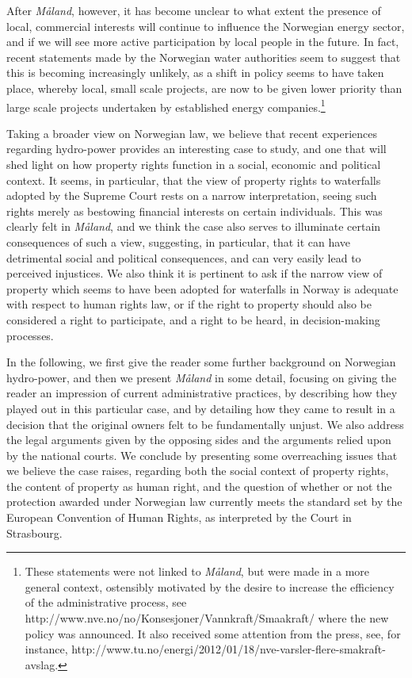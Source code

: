 After \emph{Måland}, however, it has become unclear to what extent the presence of local, commercial interests will continue to influence the Norwegian energy sector, and if we will see more active participation by local people in the future. In fact, recent statements made by the Norwegian water authorities seem to suggest that this is becoming increasingly unlikely, as a shift in policy seems to have taken place, whereby local, small scale projects, are now to be given lower priority than large scale projects undertaken by established energy companies.\footnote{These statements were not linked to \emph{Måland}, but were made in a more general context, ostensibly motivated by the desire to increase the efficiency of the administrative process, see http://www.nve.no/no/Konsesjoner/Vannkraft/Smaakraft/ where the new policy was announced. It also received some attention from the press, see, for instance, http://www.tu.no/energi/2012/01/18/nve-varsler-flere-smakraft-avslag.}

Taking a broader view on Norwegian law, we believe that recent experiences regarding hydro-power provides an interesting case to study, and one that will shed light on how property rights function in a social, economic and political context. It seems, in particular, that the view of property rights to waterfalls adopted by the Supreme Court rests on a narrow interpretation, seeing such rights merely as bestowing financial interests on certain individuals. This was clearly felt in \emph{Måland}, and we think the case also serves to illuminate certain consequences of such a view, suggesting, in particular, that it can have detrimental social and political consequences, and can very easily lead to perceived injustices. We also think it is pertinent to ask if the narrow view of property which seems to have been adopted for waterfalls in Norway is adequate with respect to human rights law, or if the right to property should also be considered a right to participate, and a right to be heard, in decision-making processes.

In the following, we first give the reader some further background on Norwegian hydro-power, and then 
we present \emph{Måland} in some detail, focusing on giving the reader an impression of current administrative practices, by describing how they played out in this particular case, and by detailing how they came to result in a decision that the original owners felt to be fundamentally unjust. We also address the legal arguments given by the opposing sides and the arguments relied upon by the national courts. We conclude by presenting some overreaching issues that we believe the case raises, regarding both the social context of property rights, the content of property as human right, and the question of whether or not the protection awarded under Norwegian law currently meets the standard set by the European Convention of Human Rights, as interpreted by the Court in Strasbourg. 


